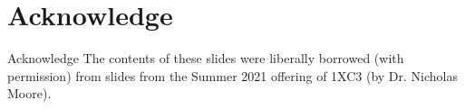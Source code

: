 \documentclass[11pt]{beamer}
\begin{document}
\section[Acknowledge]{Acknowledge}
\begin{frame}{Acknowledge}
\center
\vspace{8em}
The contents of these slides were liberally borrowed (with permission) from slides from the Summer 2021 offering of 1XC3 (by Dr. Nicholas Moore).  
\end{frame}


\end{document}
